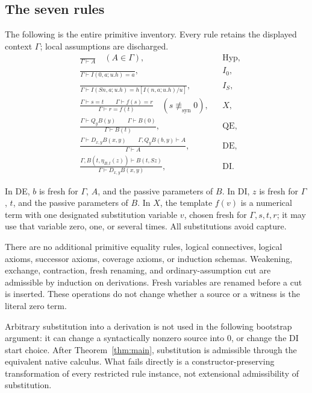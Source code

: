 \documentclass[11pt]{article}
\theoremstyle{definition}\newtheorem{definition}[theorem]{Definition}
\theoremstyle{remark}\newtheorem{remark}[theorem]{Remark}
\newcommand{\nolit}{\not\equiv_{\mathrm{syn}}}
\begin{document}
\subsection{The seven rules}

The following is the entire primitive inventory. Every rule retains the
displayed context $\Gamma$; local assumptions are discharged.
\begin{align*}
 &\frac{}{\Gamma\vdash A}\quad(A\in\Gamma),
 &&\text{Hyp},\\[4pt]
 &\frac{}{\Gamma\vdash I(0,a;u.h)=a},
 &&I_0,\\[4pt]
 &\frac{}{\Gamma\vdash I(Sn,a;u.h)=h[I(n,a;u.h)/u]},
 &&I_S,\\[4pt]
 &\frac{\Gamma\vdash s=t\qquad\Gamma\vdash f(s)=r}
        {\Gamma\vdash r=f(t)}\quad(s\nolit0),
 &&X,\\[4pt]
 &\frac{\Gamma\vdash Q_yB(y)\qquad\Gamma\vdash B(0)}
        {\Gamma\vdash B(t)},
 &&\mathrm{QE},\\[4pt]
 &\frac{\Gamma\vdash D_{x,y}B(x,y)\qquad
         \Gamma,Q_yB(b,y)\vdash A}
        {\Gamma\vdash A},
 &&\mathrm{DE},\\[4pt]
 &\frac{\Gamma,B(t,\eta_{B,t}(z))\vdash B(t,Sz)}
        {\Gamma\vdash D_{x,y}B(x,y)},
 &&\mathrm{DI}.
\end{align*}

In DE, $b$ is fresh for $\Gamma$, $A$, and the passive parameters of
$B$. In DI, $z$ is fresh for $\Gamma$, $t$, and the passive parameters
of $B$. In $X$, the template $f(v)$ is a numerical term with one
designated substitution variable $v$, chosen fresh for $\Gamma,s,t,r$;
it may use that variable zero,
one, or several times. All substitutions avoid capture.

There are no additional primitive equality rules, logical connectives,
logical axioms, successor axioms, coverage axioms, or induction schemas.
Weakening, exchange, contraction, fresh renaming, and ordinary-assumption
cut are admissible by induction on derivations. Fresh variables are
renamed before a cut is inserted. These operations do not change whether
a source or a witness is the literal zero term.

Arbitrary substitution into a derivation is not used in the following
bootstrap argument: it can change a syntactically nonzero source into
$0$, or change the DI start choice. After Theorem~\ref{thm:main},
substitution is admissible through the equivalent native calculus.
What fails directly is a constructor-preserving transformation of every
restricted rule instance, not extensional admissibility of substitution.
\end{document}
